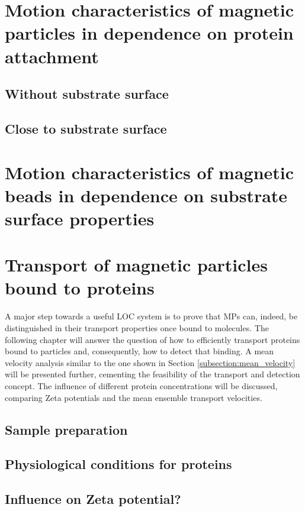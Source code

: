 \section{Motion characteristics of magnetic particles in dependence on protein attachment}
\subsection{Without substrate surface}
\subsection{Close to substrate surface}

\section{Motion characteristics of magnetic beads in dependence on substrate surface properties}%




\section{Transport of magnetic particles bound to proteins}
A major step towards a useful \ac{LOC} system is to prove that \acp{MP} can, indeed, be distinguished in their transport properties once bound to molecules. 
The following chapter will answer the question of how to efficiently transport proteins bound to particles and, consequently, how to detect that binding.
A mean velocity analysis similar to the one shown in Section \ref{subsection:mean_velocity} will be presented further, cementing the feasibility of the transport and detection concept.
The influence of different protein concentrations will be discussed, comparing Zeta potentials and the mean ensemble transport velocities.


\subsection{Sample preparation}

\subsection{Physiological conditions for proteins}


\subsection{Influence on Zeta potential?}
